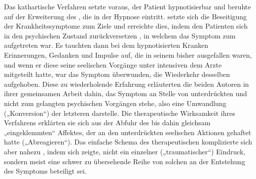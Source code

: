 \documentclass[twoside=true,titlepage=false,open=any, parskip=never, fontsize=10pt, headings=small, chapterprefix=false, appendixprefix=false]{scrbook}
\begin{document}
            
        \pstart
        Das kathartische Verfahren setzte voraus,  der Patient hypnotisierbar und beruhte auf der Erweiterung des , die in der Hypnose eintritt.  setzte sich die Beseitigung der Krankheitssymptome zum Ziele und
               erreichte dies, indem  den Patienten sich in den psychischen Zustand zurückversetzen , in welchem das Symptom zum  aufgetreten war. Es tauchten dann bei dem hypnotisierten Kranken
               Erinnerungen, Gedanken und Impulse auf, die in seinem  bisher ausgefallen waren, und wenn er diese seine seelischen Vorgänge unter intensiven  dem Arzte mitgeteilt hatte, war das Symptom überwunden, die Wiederkehr
               desselben aufgehoben. Diese  zu wiederholende Erfahrung erläuterten die beiden Autoren in ihrer
               gemeinsamen Arbeit dahin,  das Symptom an Stelle von unterdrückten und nicht zum  gelangten psychischen Vorgängen stehe, also eine Umwandlung
               („Konversion“) der letzteren darstelle. Die therapeutische Wirksamkeit ihres Verfahrens erklärten sie sich aus der Abfuhr des bis dahin gleichsam „eingeklemmten“ Affektes,
               der an den unterdrückten seelischen Aktionen gehaftet hatte
               („Abreagieren“). Das einfache Schema des therapeutischen komplizierte sich aber nahezu , indem sich zeigte,  nicht ein einzelner („traumatischer“) Eindruck, sondern meist eine schwer
               zu übersehende Reihe von solchen an der Entstehung des Symptoms
               beteiligt sei.
        \pend
    
\end{document}
